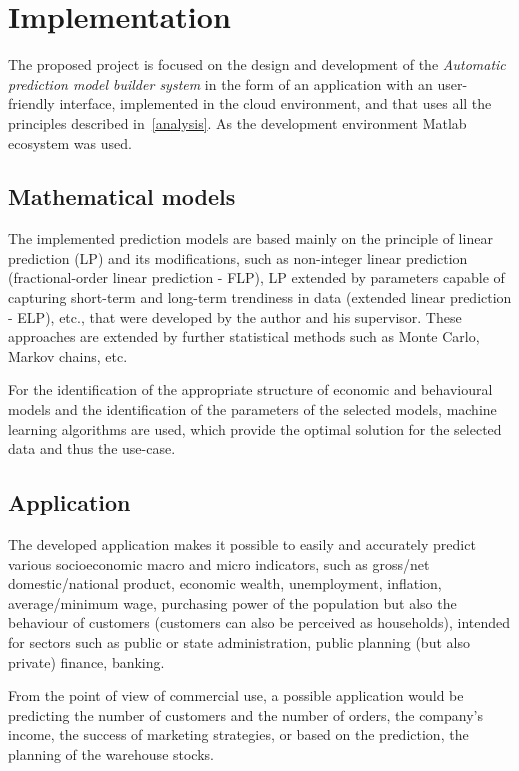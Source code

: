 \chapter{Implementation}
    The proposed project is focused on the design and development of the \emph{Automatic prediction model builder system} in the form of an application with an user-friendly interface, implemented in the cloud environment, and that uses all the principles described in~\ref{analysis}. As the development environment Matlab ecosystem was used.

    \section{Mathematical models}
    The implemented prediction models are based mainly on the principle of linear prediction (LP) and its modifications, such as non-integer linear prediction (fractional-order linear prediction - FLP), LP extended by parameters capable of capturing short-term and long-term trendiness in data (extended linear prediction - ELP), etc., that were developed by the author and his supervisor. These approaches are extended by further statistical methods such as Monte Carlo, Markov chains, etc.
    
        For the identification of the appropriate structure of economic and behavioural models and the identification of the parameters of the selected models, machine learning algorithms are used, which provide the optimal solution for the selected data and thus the use-case.
 
    \section{Application}
    The developed application makes it possible to easily and accurately predict various socioeconomic macro and micro indicators, such as gross/net domestic/national product, economic wealth, unemployment, inflation, average/minimum wage, purchasing power of the population but also the behaviour of customers (customers can also be perceived as households), intended for sectors such as public or state administration, public planning (but also private) finance, banking.
    
    From the point of view of commercial use, a possible application would be predicting the number of customers and the number of orders, the company's income, the success of marketing strategies, or based on the prediction, the planning of the warehouse stocks.

